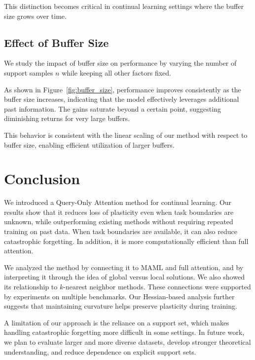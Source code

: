 \documentclass{article}
\begin{document}
This distinction becomes critical in continual learning settings where the buffer size grows over time.




\subsection{Effect of Buffer Size}

We study the impact of buffer size on performance by varying the number of support samples $n$ while keeping all other factors fixed.



As shown in Figure~\ref{fig:buffer_size}, performance improves consistently as the buffer size increases, indicating that the model effectively leverages additional past information. The gains saturate beyond a certain point, suggesting diminishing returns for very large buffers.

This behavior is consistent with the linear scaling of our method with respect to buffer size, enabling efficient utilization of larger buffers.

\normalfont
\raggedright
\section{Conclusion}
\label{sec:conclusion}

We introduced a Query-Only Attention method for continual learning. Our results show that it reduces loss of plasticity even when task boundaries are unknown, while outperforming existing methods without requiring repeated training on past data. When task boundaries are available, it can also reduce catastrophic forgetting. In addition, it is more computationally efficient than full attention.

We analyzed the method by connecting it to MAML and full attention, and by interpreting it through the idea of global versus local solutions. We also showed its relationship to $k$-nearest neighbor methods. These connections were supported by experiments on multiple benchmarks. Our Hessian-based analysis further suggests that maintaining curvature helps preserve plasticity during training.

A limitation of our approach is the reliance on a support set, which makes handling catastrophic forgetting more difficult in some settings. In future work, we plan to evaluate larger and more diverse datasets, develop stronger theoretical understanding, and reduce dependence on explicit support sets.
\end{document}
